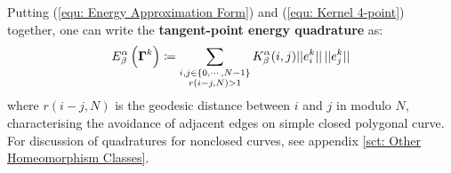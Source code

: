 \documentclass[../dissertation.tex]{subfiles}
\begin{document}
Putting (\ref{equ: Energy Approximation Form}) and (\ref{equ: Kernel 4-point}) together,
one can write the \textbf{tangent-point energy quadrature} as:
\begin{equation}
    E_{\beta}^{\alpha} \left( \boldsymbol{\Gamma}^k \right) \coloneqq \sum_{\substack{i, j \in \left\{ 0, \cdots, N-1 \right\} \\ r \left( i-j,N \right) > 1}} K_{\beta}^{\alpha} (i,j) \lvert \lvert e_i^k \rvert \rvert \, \lvert \lvert e_j^k \rvert \rvert
    \label{equ: Tangent-Point Energy Quadrature}
\end{equation}
where $r\left( i-j,N \right)$ is the geodesic distance between $i$ and $j$ in modulo $N$,
characterising the avoidance of adjacent edges on simple closed polygonal curve.
For discussion of quadratures for nonclosed curves, see appendix \ref{sct: Other Homeomorphism Classes}.
\end{document}
